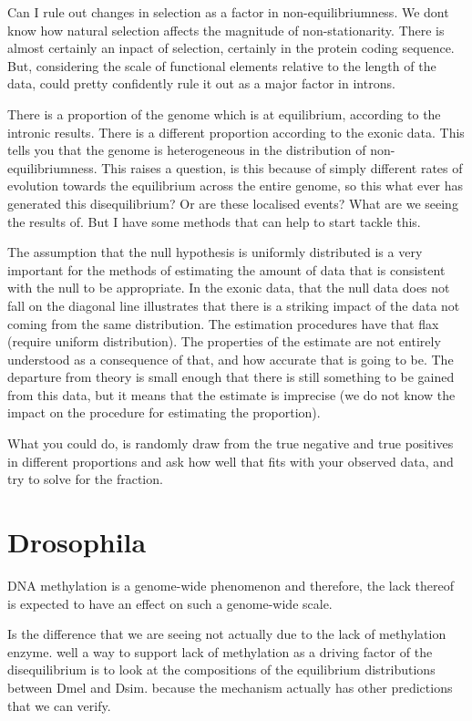 Can I rule out changes in selection as a factor in non-equilibriumness. We dont know how natural selection affects the magnitude of non-stationarity. There is almost certainly an inpact of selection, certainly in the protein coding sequence. But, considering the scale of functional elements relative to the length of the data, could pretty confidently rule it out as a major factor in introns. 


There is a proportion of the genome which is at equilibrium, according to the intronic results. There is a different proportion according to the exonic data. This tells you that the genome is heterogeneous in the distribution of non-equilibriumness. This raises a question, is this because of simply different rates of evolution towards the equilibrium across the entire genome, so this what ever has generated this disequilibrium? Or are these localised events? What are we seeing the results of. But I have some methods that can help to start tackle this. 


The assumption that the null hypothesis is uniformly distributed is a very important for the methods of estimating the amount of data that is consistent with the null to be appropriate. In the exonic data, that the null data does not fall on the diagonal line illustrates that there is a striking impact of the data not coming from the same distribution. The estimation procedures have that flax (require uniform distribution). The properties of the estimate are not entirely understood as a consequence of that, and how accurate that is going to be. The departure from theory is small enough that there is still something to be gained from this data, but it means that the estimate is imprecise (we do not know the impact on the procedure for estimating the proportion). 



What you could do, is randomly draw from the true negative and true positives in different proportions and ask how well that fits with your observed data, and try to solve for the fraction. 



\section{Drosophila}

 DNA methylation is a genome-wide phenomenon and therefore, the lack thereof is expected to have an effect on such a genome-wide scale.  
 
 
 Is the difference that we are seeing not actually due to the lack of methylation enzyme. well a way to support lack of methylation as a driving factor of the disequilibrium is to look at the compositions of the equilibrium distributions between Dmel and Dsim. because the mechanism actually has other predictions that we can verify. 

